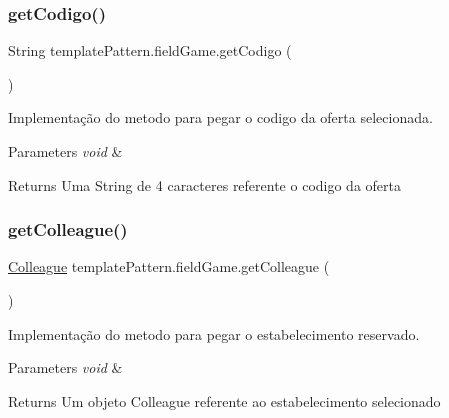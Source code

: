 \subsubsection{\texorpdfstring{getCodigo()}{getCodigo()}}
{\footnotesize\ttfamily String template\+Pattern.\+field\+Game.\+get\+Codigo (\begin{DoxyParamCaption}{ }\end{DoxyParamCaption})}



Implementação do metodo para pegar o codigo da oferta selecionada. 


\begin{DoxyParams}{Parameters}
{\em void} & \\
\hline
\end{DoxyParams}
\begin{DoxyReturn}{Returns}
Uma String de 4 caracteres referente o codigo da oferta 
\end{DoxyReturn}
\mbox{\label{classtemplate_pattern_1_1field_game_a4dde8ef0678ca5309c287097746400e6}} 
\subsubsection{\texorpdfstring{getColleague()}{getColleague()}}
{\footnotesize\ttfamily \mbox{\hyperlink{classmediator_pattern_1_1_colleague}{Colleague}} template\+Pattern.\+field\+Game.\+get\+Colleague (\begin{DoxyParamCaption}{ }\end{DoxyParamCaption})}



Implementação do metodo para pegar o estabelecimento reservado. 


\begin{DoxyParams}{Parameters}
{\em void} & \\
\hline
\end{DoxyParams}
\begin{DoxyReturn}{Returns}
Um objeto Colleague referente ao estabelecimento selecionado 
\end{DoxyReturn}
\mbox{\label{classtemplate_pattern_1_1field_game_a5345d32c9a678848b68ab965156b6bb2}} 
